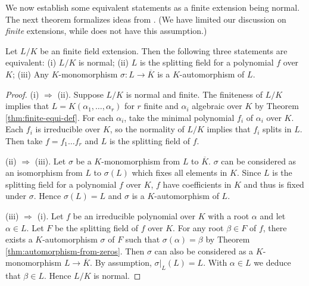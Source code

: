 We now establish some equivalent statements as a finite extension being normal. The next theorem formalizes ideas from \cite{galois-theory-lectures}. (We have limited our discussion on \textit{finite} extensions, while \cite{galois-theory-lectures} does not have this assumption.)

\begin{theorem} \label{thm:normal-equiv-def}
    Let $L/K$ be an finite field extension. Then the following three statements are equivalent: (i) $L/K$ is normal; 
    (ii) $L$ is the splitting field for a polynomial $f$ over $K$; 
    (iii) Any $K$-monomorphism $\sigma: L \to \overline K$ is a $K$-automorphism of $L$. 
\end{theorem}

\begin{proof}
    (i) $\Rightarrow$ (ii). 
    Suppose $L/K$ is normal and finite. The finiteness of $L/K$ implies that $L = K(\alpha_1, \dots, \alpha_r)$ for $r$ finite and $\alpha_i$ algebraic over $K$ by Theorem \ref{thm:finite-equi-def}. For each $\alpha_i$, take the minimal polynomial $f_i$ of $\alpha_i$ over $K$. Each $f_i$ is irreducible over $K$, so the normality of $L/K$ implies that $f_i$ splits in $L$.  Then take $f = f_1 \dots f_r$ and $L$ is the splitting field of $f$.
	
    

    (ii) $\Rightarrow$ (iii). Let $\sigma$ be a $K$-monomorphism from $L$ to $\overline K$. $\sigma$ can be considered as an isomorphism from $L$ to $\sigma(L)$ which fixes all elements in $K$. Since $L$ is the splitting field for a polynomial $f$ over $K$, $f$ have coefficients in $K$ and thus is fixed under $\sigma$. Hence $\sigma(L) = L$ and $\sigma$ is a $K$-automorphism of $L$. 
    
    (iii) $\Rightarrow$ (i). Let $f$ be an irreducible polynomial over $K$ with a root $\alpha$ and let $\alpha \in L$. Let $F$ be the splitting field of $f$ over $K$. For any root $\beta \in F$ of $f$, there exists a $K$-automorphism $\sigma$ of $F $ such that $\sigma(\alpha) = \beta$ by Theorem \ref{thm:automorphism-from-zeros}. Then $\sigma$ can also be considered as a $K$-monomorphism $L \to \overline K$. By assumption, $\sigma|_L(L) = L$. With $\alpha \in L$ we deduce that $\beta \in L$. Hence $L/K$ is normal.
\end{proof}

